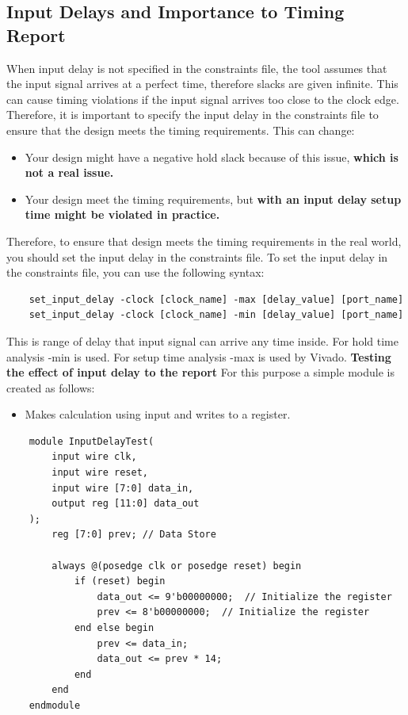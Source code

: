 \documentclass{report}
\begin{document}
\subsection{Input Delays and Importance to Timing Report}
When input delay is not specified in the constraints file, the tool assumes that the input signal arrives at a perfect time, therefore slacks are given infinite. This can cause timing violations if the input signal arrives too close to the clock edge. Therefore, it is important to specify the input delay in the constraints file to ensure that the design meets the timing requirements. This can change:
\begin{itemize}
    \item Your design might have a negative hold slack because of this issue, \textbf{which is not a real issue.}
    \item Your design meet the timing requirements, but \textbf{ with an input delay setup time might be violated in practice.}
\end{itemize}
Therefore, to ensure that design meets the timing requirements in the real world, you should set the input delay in the constraints file.
To set the input delay in the constraints file, you can use the following syntax:
\begin{verbatim}
    set_input_delay -clock [clock_name] -max [delay_value] [port_name]
    set_input_delay -clock [clock_name] -min [delay_value] [port_name]
\end{verbatim}
This is range of delay that input signal can arrive any time inside. For hold time analysis -min is used. For setup time analysis -max is used by Vivado.
\textbf{Testing the effect of input delay to the report}
For this purpose a simple module is created as follows:
\begin{itemize}
    \item Makes calculation using input and writes to a register.
\end{itemize}
\begin{verbatim}
    module InputDelayTest(
        input wire clk,
        input wire reset,
        input wire [7:0] data_in,
        output reg [11:0] data_out
    );
        reg [7:0] prev; // Data Store

        always @(posedge clk or posedge reset) begin
            if (reset) begin
                data_out <= 9'b00000000;  // Initialize the register
                prev <= 8'b00000000;  // Initialize the register
            end else begin
                prev <= data_in;
                data_out <= prev * 14;
            end
        end
    endmodule
\end{verbatim}
\end{document}

